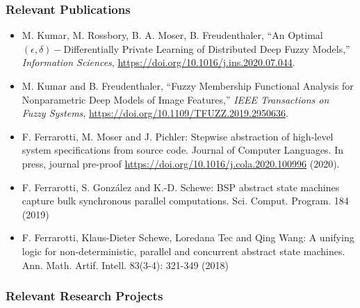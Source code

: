 \documentclass[a4paper,11pt]{article}
\begin{document}
\subsubsection*{Relevant Publications}

\begin{itemize}
\item M. Kumar, M. Rossbory, B. A. Moser, B. Freudenthaler, ``An Optimal $(\epsilon,\delta)-$Differentially Private Learning of Distributed Deep Fuzzy Models,'' \emph{Information Sciences}, \url{https://doi.org/10.1016/j.ins.2020.07.044}{}. 
\item M. Kumar and B. Freudenthaler, ``Fuzzy Membership Functional Analysis for Nonparametric Deep Models of Image Features,'' \emph{IEEE Transactions on Fuzzy Systems}, \url{https://doi.org/10.1109/TFUZZ.2019.2950636}{}.
\item F. Ferrarotti, M. Moser and J. Pichler: Stepwise abstraction of high-level system specifications from source code. Journal of Computer Languages. In press, journal pre-proof \url{https://doi.org/10.1016/j.cola.2020.100996} (2020).
\item F. Ferrarotti, S. González and K.-D. Schewe: BSP abstract state machines capture bulk synchronous parallel computations. Sci. Comput. Program. 184 (2019)
\item F. Ferrarotti, Klaus-Dieter Schewe, Loredana Tec and Qing Wang: A unifying logic for non-deterministic, parallel and concurrent abstract state machines. Ann. Math. Artif. Intell. 83(3-4): 321-349 (2018)

\end{itemize}

\subsubsection*{Relevant Research Projects}
\end{document}

